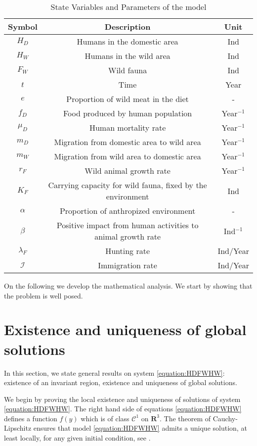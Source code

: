 \documentclass{article}
\newcommand{\lfw}{\lambda_{F}}
\newcommand{\lfw}{\lambda_{F}}
\begin{document}
\begin{table}[ht]
\center
\begin{tabular}{|c|c|c|}
\hline 
Symbol & Description & Unit \\ 
\hline \hline
$H_D$ & Humans in the domestic area & Ind \\
$H_W$ & Humans in the wild area & Ind \\
$F_W$ & Wild fauna & Ind \\
\hline \hline
$t$ & Time & Year \\
$e$ & Proportion of wild meat in the diet & - \\
$f_D$ & Food produced by human population & Year$^{-1}$ \\
$\mu_D$ & Human mortality rate  & Year$^{-1}$ \\
$m_D$ & Migration from domestic area to wild area & Year$^{-1}$ \\
$m_W$ & Migration from wild area to domestic area & Year$^{-1}$ \\
$r_F$ & Wild animal growth rate & Year$^{-1}$ \\
$K_F$ & Carrying capacity for wild fauna, fixed by the environment& Ind \\
$\alpha$ & Proportion of anthropized environment & - \\
$\beta$ & Positive impact from human activities to animal growth rate & Ind$^{-1}$  \\
$\lfw$ & Hunting rate & Ind/Year\\
$\mathcal{I}$ & Immigration rate &Ind/Year\\
\hline
\end{tabular}
\caption{State Variables and Parameters of the model}
\label{table:symbol}
\end{table}

On the following we develop the mathematical analysis. We start by showing that the problem is well posed.

\section{Existence and uniqueness of global solutions}
In this section, we state general results on system \eqref{equation:HDFWHW}:  existence of an invariant region, existence and uniqueness of global solutions.

We begin by proving the local existence and uniqueness of solutions of system \eqref{equation:HDFWHW}. The right hand side of equations \eqref{equation:HDFWHW} defines a function $f(y)$ which is of class $\mathcal{C}^1$ on $\mathbf{R}^3$. The theorem of Cauchy-Lipschitz ensures that model \eqref{equation:HDFWHW} admits a unique solution, at least locally, for any given initial condition, see \cite{walter_ordinary_1998}.
\end{document}

